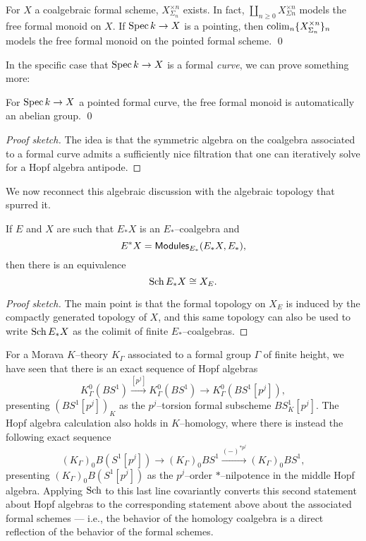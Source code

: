 \begin{corollary}
For $X$ a coalgebraic formal scheme, $X^{\times n}_{\Sigma_n}$ exists.  In fact, $\coprod_{n \ge 0} X^{\times n}_{\Sigma n}$ models the free formal monoid on $X$.  If $\operatorname{Spec} k \to X$ is a pointing, then $\operatorname*{colim}_n \{X^{\times n}_{\Sigma_n}\}_n$ models the free formal monoid on the pointed formal scheme. \qed
\end{corollary}

In the specific case that $\operatorname{Spec} k \to X$ is a formal \emph{curve}, we can prove something more:
\begin{corollary}
For $\operatorname{Spec} k \to X$ a pointed formal curve, the free formal monoid is automatically an abelian group. \qed
\end{corollary}
\begin{proof}[Proof sketch]
The idea is that the symmetric algebra on the coalgebra associated to a formal curve admits a sufficiently nice filtration that one can iteratively solve for a Hopf algebra antipode.
\end{proof}

We now reconnect this algebraic discussion with the algebraic topology that spurred it.

\begin{lemma}
If $E$ and $X$ are such that $E_* X$ is an $E_*$--coalgebra and \[E^* X = \mathsf{Modules}_{E_*}(E_* X, E_*),\] then there is an equivalence \[\Sch E_* X \cong X_E. \qed\]
\end{lemma}
\begin{proof}[Proof sketch]
The main point is that the formal topology on $X_E$ is induced by the compactly generated topology of $X$, and this same topology can also be used to write $\operatorname{Sch} E_* X$ as the colimit of finite $E_*$--coalgebras.
\end{proof}

\begin{example}
For a Morava $K$--theory $K_\Gamma$ associated to a formal group $\Gamma$ of finite height, we have seen that there is an exact sequence of Hopf algebras \[K_\Gamma^0(BS^1) \xrightarrow{[p^j]} K_\Gamma^0(BS^1) \to K_\Gamma^0(BS^1[p^j]),\] presenting $(BS^1[p^j])_K$ as the $p^j$--torsion formal subscheme $BS^1_K[p^j]$.  The Hopf algebra calculation also holds in $K$--homology, where there is instead the following exact sequence \[(K_\Gamma)_0 B(S^1[p^j]) \to (K_\Gamma)_0 BS^1 \xrightarrow{(-)^{\ast p^j}} (K_\Gamma)_0 BS^1,\] presenting $(K_\Gamma)_0 B(S^1[p^j])$ as the $p^j$--order $\ast$--nilpotence in the middle Hopf algebra.  Applying $\operatorname{Sch}$ to this last line covariantly converts this second statement about Hopf algebras to the corresponding statement above about the associated formal schemes --- i.e., the behavior of the homology coalgebra is a direct reflection of the behavior of the formal schemes.
\end{example}

